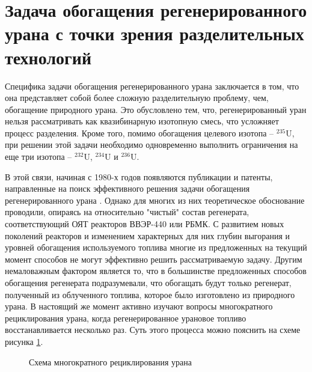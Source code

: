 
\section{Задача обогащения регенерированного урана с точки зрения разделительных технологий}

Специфика задачи обогащения регенерированного урана заключается в том, что она представляет собой более сложную разделительную проблему, чем, обогащение  природного урана.
Это обусловлено тем, что, регенерированный уран нельзя рассматривать как квазибинарную изотопную смесь, что усложняет процесс разделения. Кроме того, помимо обогащения целевого изотопа -- $^{235}$U, при решении этой задачи необходимо одновременно выполнить ограничения на еще три изотопа -- $^{232}$U, $^{234}$U и $^{236}$U.

В этой связи, начиная с 1980-х годов появляются публикации и патенты, направленные на поиск эффективного решения задачи обогащения регенерированного урана \cite{smirnovKaskadnyeShemyZadachah2012,sulaberidzeNekotoryhRazdelitelnyhProblemah2004,kazukihidaSimultaneousEvaluationEffects1986,sidenkoIssledovanieKaskadnyhShem,smirnovObogashchenieRegenerirovannogoUrana2018,prusakovKorrekciyaIzotopnogoSostava2008}. Однако для многих из них теоретическое обоснование проводили, опираясь на относительно "чистый" состав регенерата, соответствующий ОЯТ реакторов ВВЭР-440 или РБМК. С развитием новых поколений реакторов и изменением характерных для них глубин выгорания и уровней обогащения используемого топлива многие из предложенных на текущий момент способов не могут эффективно решить рассматриваемую задачу.
Другим немаловажным фактором является то, что в большинстве предложенных способов обогащения регенерата подразумевали, что обогащать будут только регенерат, полученный из облученного топлива, которое было изготовлено из природного урана. В настоящий же момент активно изучают вопросы многократного рециклирования урана, когда регенерированное урановое топливо восстанавливается несколько раз. Суть этого процесса можно пояснить на схеме рисунка \ref{recycle}.

\begin{figure}[ht]
  \caption{Схема многократного рециклирования урана}\label{recycle}
\end{figure}

